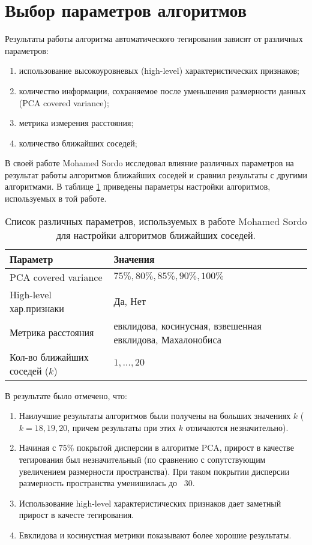 \section{Выбор параметров алгоритмов}

Результаты работы алгоритма автоматического тегирования зависят от различных параметров:
\begin{enumerate}
 \item использование высокоуровневых (high-level) характеристических признаков;
 \item количество информации, сохраняемое после уменьшения размерности данных (PCA covered variance);
 \item метрика измерения расстояния;
 \item количество ближайших соседей;
\end{enumerate}

В своей работе Mohamed Sordo исследовал влияние различных параметров на результат работы алгоритмов ближайших соседей 
и сравнил результаты с другими алгоритмами. В таблице \ref{tab:old_algo_settings} приведены параметры настройки алгоритмов, используемых в той работе.
\begin{table}[ht]
\centering
\captionsetup{justification=centering}
\caption{Список различных параметров, используемых в работе Mohamed Sordo для настройки алгоритмов ближайших соседей.}
\label{tab:old_algo_settings}
\begin{tabular}{ p{5cm}  p{4cm} }
  \hline    
  Параметр & Значения \\
  \hline    
  PCA covered variance & $75\%, 80\%, 85\%, 90\%, 100\% $ \\
  High-level хар.признаки & Да, Нет \\
  Метрика расстояния & евклидова, косинусная, взвешенная евклидова, Махалонобиса\\
  Кол-во ближайших соседей ($k$) & $1, \ldots, 20$ \\
  \hline    
\end{tabular}
\end{table}

В результате \cite{msordo_thesis} было отмечено, что:
\begin{enumerate}
 \item Наилучшие результаты алгоритмов были получены на больших значениях $k$ ($k = 18, 19, 20$, причем результаты при этих $k$ отличаются незначительно).
 \item Начиная с $75\%$ покрытой дисперсии в алгоритме PCA, прирост в качестве тегирования был незначительный (по сравнению с сопутствующим увеличением размерности пространства).
 При таком покрытии дисперсии размерность пространства уменишилась до ~30.
 \item Использование high-level характеристических признаков дает заметный прирост в качесте тегирования.
 \item Евклидова и косинустная метрики показывают более хорошие результаты.
\end{enumerate}

